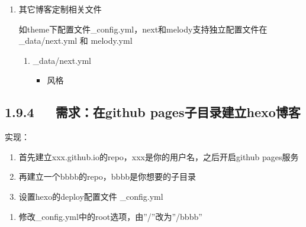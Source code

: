 \documentclass[letterpaper,12pt,english]{sphinxmanual}
\begin{document}
\begin{enumerate}
\begin{itemize}
\end{itemize}

\item {} 
其它博客定制相关文件

如theme下配置文件\_config.yml，next和melody支持独立配置文件在\_data/next.yml 和 melody.yml
\begin{enumerate}
%
\item {} 
\_data/next.yml
\begin{itemize}
\item {} 
风格

\begin{sphinxVerbatim}[commandchars=\\\{\}]
 
\end{sphinxVerbatim}

\end{itemize}

\end{enumerate}

\end{enumerate}


\subsection{1.9.4   需求：在github pages子目录建立hexo博客}
\label{\detokenize{001software/001install/001._u7f51_u7ad9/hexo:github-pageshexo}}

实现：
\begin{enumerate}
%
\item {} 
首先建立xxx.github.io的repo，xxx是你的用户名，之后开启github pages服务

\item {} 
再建立一个bbbb的repo，bbbb是你想要的子目录

\item {} 
设置hexo的deploy配置文件 \_config.yml

\end{enumerate}

\begin{sphinxVerbatim}[commandchars=\\\{\}]
  
   
   
\end{sphinxVerbatim}
\begin{enumerate}
%
\setcounter{enumi}{3}
\item {} 
修改\_config.yml中的root选项，由”/”改为”/bbbb”

\end{enumerate}
\end{document}
